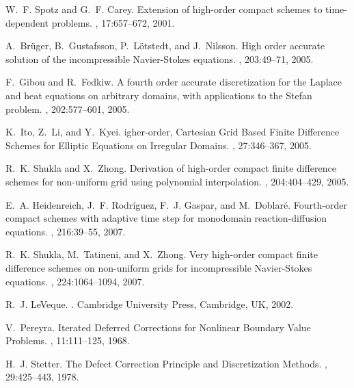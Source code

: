 \documentclass[fleqn,12pt,twoside]{article}
\begin{document}
\begin{thebibliography}{10}

W.~F. Spotz and G.~F. Carey.
\newblock Extension of high-order compact schemes to time-dependent problems.
, 17:657--672, 2001.

A.~Br\"uger, B.~Gustafsson, P.~L\"otstedt, and J.~Nilsson.
\newblock High order accurate solution of the incompressible {N}avier-{S}tokes
  equations.
, 203:49--71, 2005.

F.~Gibou and R.~Fedkiw.
\newblock A fourth order accurate discretization for the {L}aplace and heat
  equations on arbitrary domains, with applications to the {S}tefan problem.
, 202:577--601, 2005.

K.~Ito, Z.~Li, and Y.~Kyei.
igher-order, {C}artesian {G}rid {B}ased {F}inite {D}ifference
  {S}chemes for {E}lliptic {E}quations on {I}rregular {D}omains.
, 27:346--367, 2005.

R.~K. Shukla and X.~Zhong.
\newblock Derivation of high-order compact finite difference schemes for
  non-uniform grid using polynomial interpolation.
, 204:404--429, 2005.

E.~A. Heidenreich, J.~F. Rodr\'iguez, F.~J. Gaspar, and M.~Doblar\'e.
\newblock Fourth-order compact schemes with adaptive time step for monodomain
  reaction-diffusion equations.
, 216:39--55, 2007.

R.~K. Shukla, M.~Tatineni, and X.~Zhong.
\newblock Very high-order compact finite difference schemes on non-uniform
  grids for incompressible {N}avier-{S}tokes equations.
, 224:1064--1094, 2007.

R.~J. LeVeque.
.
\newblock Cambridge University Press, Cambridge, UK, 2002.

V.~Pereyra.
\newblock Iterated {D}eferred {C}orrections for {N}onlinear {B}oundary {V}alue
  {P}roblems.
, 11:111--125, 1968.

H.~J. Stetter.
\newblock The {D}efect {C}orrection {P}rinciple and {D}iscretization {M}ethods.
, 29:425--443, 1978.


\end{thebibliography}
\end{document}
